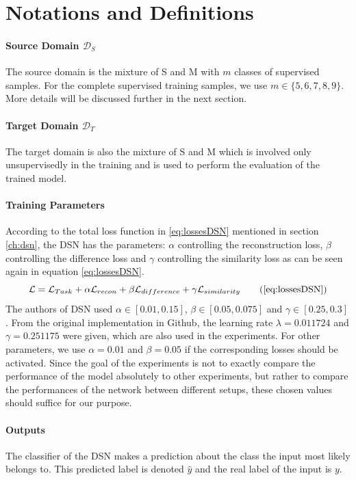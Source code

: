 \section*{Notations and Definitions}
\paragraph*{Source Domain $\mathcal{D}_S$} The source domain is the mixture of S and M with $m$ classes of supervised samples. For the complete supervised training samples, we use $m \in \{5, 6, 7, 8, 9\}$. More details will be discussed further in the next section.
\paragraph*{Target Domain $\mathcal{D}_T$} The target domain is also the mixture of S and M which is involved only unsupervisedly in the training and is used to perform the evaluation of the trained model.
\paragraph*{Training Parameters} According to the total loss function in \eqref{eq:lossesDSN} mentioned in section \ref{ch:dsn}, the DSN has the parameters: $\alpha$ controlling the reconstruction loss, $\beta$ controlling the difference loss and $\gamma$ controlling the similarity loss as can be seen again in equation \ref{eq:lossesDSN}. 
	\begin{equation}
			\mathcal{L} = \mathcal{L}_{Task} + \alpha \mathcal{L}_{recon} + \beta \mathcal{L}_{difference} + \gamma \mathcal{L}_{similarity}  \tag{\ref{eq:lossesDSN}}
	\end{equation}
The authors of DSN used $\alpha \in [0.01, 0.15]$, $\beta \in [0.05, 0.075]$ and $\gamma \in [0.25, 0.3]$. From the original implementation in Github, the learning rate $\lambda = 0.011724$ and $\gamma = 0.251175$ were given, which are also used in the experiments. For other parameters, we use $\alpha = 0.01$ and $\beta = 0.05$ if the corresponding losses should be activated. Since the goal of the experiments is not to exactly compare the performance of the model absolutely to other experiments, but rather to compare the performances of the network between different setups, these chosen values should suffice for our purpose. 
\paragraph*{Outputs} The classifier of the DSN makes a prediction about the class the input most likely belongs to. This predicted label is denoted $\hat{y}$ and the real label of the input is $y$.  \\

